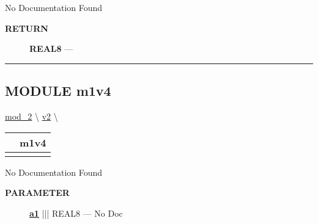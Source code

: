 \par





No Documentation Found








\par
\begin{description}
\item [\colorbox{tagtype}{\color{white} \textbf{\textsf{RETURN}}}] \textbf{REAL8} --- 
\end{description}




\rule{\linewidth}{0.5pt}
\subsection*{\textsf{\colorbox{headtoc}{\color{white} MODULE}
m1v4}}

\hypertarget{ecldoc:mod_1.m1v4}{}
\hspace{0pt} \hyperlink{ecldoc:mod_2}{mod_2} \textbackslash 
\hspace{0pt} \hyperlink{ecldoc:mod_1}{v2} \textbackslash 

{\renewcommand{\arraystretch}{1.5}
\begin{tabularx}{\textwidth}{|>{\raggedright\arraybackslash}l|X|}
\hline
\hspace{0pt}\mytexttt{\color{red} } & \textbf{m1v4} \\
\hline
\multicolumn{2}{|>{\raggedright\arraybackslash}X|}{\hspace{0pt}\mytexttt{\color{param} (REAL8 a1)}} \\
\hline
\end{tabularx}
}

\par





No Documentation Found






\par
\begin{description}
\item [\colorbox{tagtype}{\color{white} \textbf{\textsf{PARAMETER}}}] \textbf{\underline{a1}} ||| REAL8 --- No Doc
\end{description}






